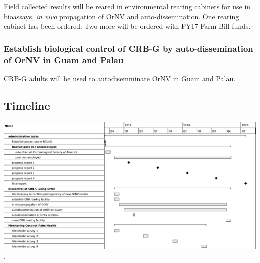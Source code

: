 \documentclass[12pt,letterpaper,english,bibliography=totocnumbered, abstract=on]{scrartcl}
\begin{document}
Field collected results will be reared in environmental rearing cabinets
for use in bioassays, \emph{in vivo} propagation of OrNV and auto-dissemination.
One rearing cabinet has been ordered. Two more will be ordered with
FY17 Farm Bill funds.

\subsubsection{Establish biological control of CRB-G by auto-dissemination of OrNV
in Guam and Palau}

CRB-G adults will be used to autodisemminate OrNV in Guam and Palau.

\subsection{Timeline}

\includegraphics[width=1\textwidth,height=1\textheight,keepaspectratio]{output}.
\end{document}
